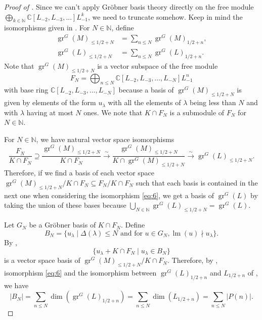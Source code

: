 \documentclass[a4paper, 12pt, reqno]{amsart}
\theoremstyle{remark}
\DeclareMathOperator{\gr}{gr}
\DeclareMathOperator{\lm}{lm}
\begin{document}
\begin{proof}[Proof of ]
  Since we can't apply Gr\"{o}bner basis theory directly on the free module $\bigoplus_{k \in \mathbb{N}}\mathbb{C}[L_{-2}, L_{-3}, \dots]L_{-1}^k$, we need to truncate somehow.
  Keep in mind the isomorphisms given in .
  For $N \in \mathbb{N}$, define
  \begin{align*}
    \gr^G(M)_{\le 1/2 + N} &= \sum_{n \le N}\gr^G(M)_{1/2 + n}, \\
    \gr^G(L)_{\le 1/2 + N} &= \sum_{n \le N}\gr^G(L)_{1/2 + n}.
  \end{align*}
  Note that $\gr^G(M)_{\le 1/2 + N}$ is a vector subspace of the free module
  \begin{equation*}
    F_N = \bigoplus_{n \le N}\mathbb{C}[L_{-2}, L_{-3}, \dots, L_{-N}]L_{-1}^n
  \end{equation*}
  with base ring $\mathbb{C}[L_{-2}, L_{-3}, \dots, L_{-N}]$ because a basis of $\gr^G(M)_{\le 1/2 + N}$ is given by elements of the form $u_{\lambda}$ with all the elements of $\lambda$ being less than $N$ and with $\lambda$ having at most $N$ ones.
  We note that $K \cap F_N$ is a submodule of $F_N$ for $N \in \mathbb{N}$.

  For $N \in \mathbb{N}$, we have natural vector space isomorphisms
  \begin{equation}
    \label{eq:6}
    \frac{F_N}{K \cap F_N} \supseteq \frac{\gr^G(M)_{\le 1/2 + N}}{K \cap F_N} \xrightarrow{\sim} \frac{\gr^G(M)_{\le 1/2 + N}}{K \cap \gr^G(M)_{\le 1/2 + N}} \xrightarrow{\sim} \gr^G(L)_{\le 1/2 + N}.
  \end{equation}
  Therefore, if we find a basis of each vector space $\gr^G(M)_{\le 1/2 + N}/K \cap F_N \subseteq F_N/K \cap F_N$ such that each basis is contained in the next one when considering the isomorphism \eqref{eq:6}, we get a basis of $\gr^G(L)$ by taking the union of these bases because $\bigcup_{N \in \mathbb{N}}\gr^G(L)_{\le 1/2 + N} = \gr^G(L)$.

  Let $G_N$ be a Gr\"{o}bner basis of $K \cap F_N$.
  Define
  \begin{equation*}
    B_N = \{u_{\lambda} \mid \Delta(\lambda) \le N\text{ and for }u \in G_N, \lm(u) \nmid u_{\lambda}\}.
  \end{equation*}
  By \cite[Proposition 3.6.4]{adams_introduction_1994},
  \begin{equation}
    \label{eq:7}
    \{u_{\lambda} + K \cap F_N \mid u_{\lambda} \in B_N\}
  \end{equation}
  is a vector space basis of $\gr^G(M)_{\le 1/2 + N}/K \cap F_N$.
  Therefore, by , isomorphism \eqref{eq:6} and the isomorphism between $\gr^G(L)_{1/2 + n}$ and $L_{1/2 + n}$ of , we have
  \begin{equation*}
    |B_N| = \sum_{n \le N}\dim(\gr^G(L)_{1/2 + n}) = \sum_{n \le N}\dim(L_{1/2 + n}) = \sum_{n \le N}|P(n)|.
  \end{equation*}


\end{proof}
\end{document}
